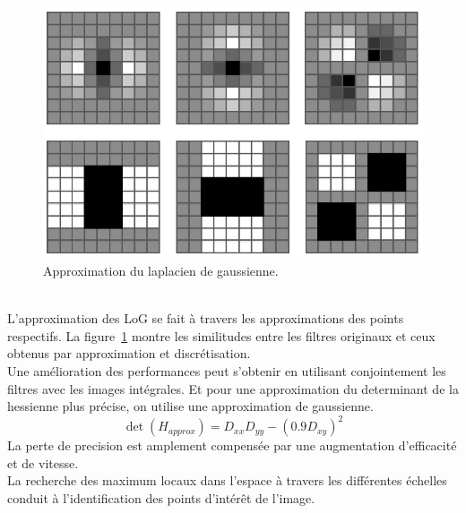 \documentclass[a4paper,12pt]{report}
\begin{document}
\begin{figure}[ht]
\centering
\includegraphics[scale=0.3]{figure3.png}
\caption{Approximation du laplacien de gaussienne.}
\label{fig3}
\end{figure}
\\L'approximation des LoG se fait à travers les approximations des points respectifs. La figure~\ref{fig3} montre les similitudes entre les filtres originaux et ceux obtenus par approximation et discrétisation.
\\Une amélioration des performances peut s'obtenir en utilisant conjointement les filtres avec les images intégrales. Et pour une approximation du determinant de la hessienne plus précise, on utilise une approximation de gaussienne.
$$\det(H_{approx})=D_{xx}D_{yy}-(0.9D_{xy})^2$$
La perte de precision est amplement compensée par une augmentation d'efficacité et de vitesse.
\\La recherche des maximum locaux dans l'espace à travers les différentes échelles conduit à l'identification des points d'intérêt de l'image.
\end{document}
